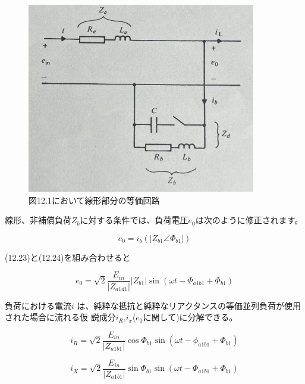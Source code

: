 \documentclass[fleqn,11pt,a4paper,dvipdfmx]{jsarticle}
\numberwithin{equation}{section}
\begin{document}
\setcounter{figure}{1}
\begin{figure}[b]
  \begin{center}
    \includegraphics[width=100mm]{./img/circuit.jpg}
    \caption{図12.1において線形部分の等価回路}
    \label{circuit}
  \end{center}
\end{figure}

\newpage

線形、非補償負荷$Z_b$に対する条件では、負荷電圧$e_0$は次のように修正されます。

\begin{equation}
  e_0 = i_b \left(\left|Z_{b1} \angle \Phi_{b1}\right|\right)
\end{equation}

(12.23)と(12.24)を組み合わせると

\begin{equation}
  e_0 = \sqrt{2} \frac{E_{in}}{\left|Z_{a1d1}\right|} \left|Z_{b1}\right| \sin \left(\omega t - \Phi_{a1b1} + \Phi_{b1}\right)
\end{equation}

負荷における電流$i$ は、純粋な抵抗と純粋なリアクタンスの等価並列負荷が使用された場合に流れる仮 説成分$i_R$,$i_x$($e_0$に関して)に分解できる。

\begin{equation}
  i_R = \sqrt{2} \frac{E_{in}}{\left|Z_{a1b1}\right|} \cos \Phi_{b1} \sin \left(\omega t - \phi_{a1b1} + \Phi_{b1}\right)
\end{equation}

\begin{equation}
  i_X = \sqrt{2} \frac{E_{in}}{\left|Z_{a1b1}\right|} \sin \Phi_{b1} \sin \left(\omega t - \Phi_{a1b1} + \Phi_{b1}\right)
\end{equation}
\end{document}
